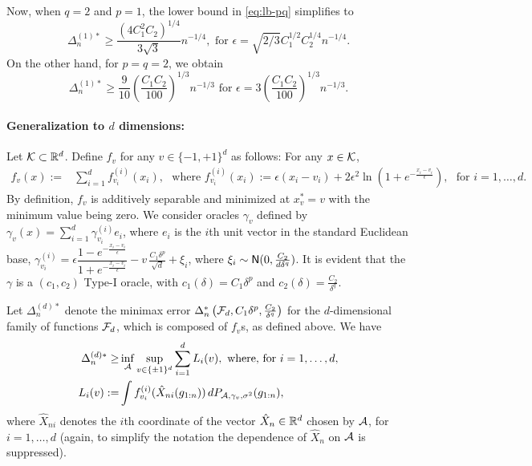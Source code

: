 Now, when $q=2$ and $p=1$, the lower bound in \eqref{eq:lb-pq} simplifies to
\[
\Delta_n^{(1)*} \ge \dfrac{ (4C_1^2C_2)^{1/4}}{3\sqrt{3}} n^{-1/4}, \text{ for } \epsilon=\sqrt{2/3}C_1^{1/2}C_2^{1/4} n^{-1/4}.
\]
On the other hand, for $p=q=2$, we obtain
\[
\Delta_n^{(1)*} \ge  \frac{9}{10}\left(\frac{C_1 C_2}{100}\right)^{1/3} n^{-1/3} \text{ for } \epsilon=3\left(\frac{C_1 C_2}{100}\right)^{1/3}n^{-1/3}.
\]



\paragraph{Generalization to $d$ dimensions:}

Let $\mathcal{K} \subset \mathbb{R}^d$.
Define $f_v$ for any $v\in \{-1,+1\}^d$ as follows: For any $x \in \mathcal{K}$, 
\begin{align*}
  f_v(x) :=& \sum_{i=1}^d f^{(i)}_{v_i}(x_i), \,\,  \text{ where }
  f^{(i)}_{v_i}(x_i) := \epsilon\left( x_i-v_i\right)+2\epsilon^2 \ln\left(1+e^{-\frac{x_i-v_i}{\epsilon}}  \right),  \,\, \text{ for } i=1,\ldots,d.
\end{align*}
By definition, $f_v$ is additively separable and minimized at $x^*_v=v$ with the minimum value being zero.
We consider oracles $\gamma_v$ defined by
$\gamma_v(x) = \sum_{i=1}^d \gamma_{v_i}^{(i)}e_i$, where 
$e_i$ is the $i$th unit vector in the standard Euclidean base,
$\gamma_{v_i}^{(i)} = 
\epsilon \dfrac{1-e^{-\frac{x_i-v_i}{\epsilon}}}{1+e^{-\frac{x_i-v_i}{\epsilon}}} - v\, \frac{C_1 \delta^p}{\sqrt{d}}  + \xi_i
$, where $\xi_i \sim \mathsf{N}(0,\frac{C_2}{d\delta^q})$. 
It is evident that the $\gamma$ is a $(c_1,c_2)$ Type-I oracle, with $c_1(\delta)=C_1\delta^p$ and $c_2(\delta)=\frac{C_2}{\delta^q}$.

Let $\Delta_n^{(d)*}$ denote the minimax error $\Delta_n^*\left(\mathcal{F}_d, C_1\delta^p,\frac{C_2}{\delta^q}\right)$ for the $d$-dimensional family of functions $\mathcal{F}_d$, which is composed of $f_v$s, as defined above. We have
\begin{align*}
 \Delta_n^{(d)*} \ge& \inf_{\mathcal{A}}  \sup_{v\in \{\pm 1 \}^d}\sum_{i=1}^d L_i(v), \text{ where, for } i=1,\ldots,d,\\
 L_i(v) := & \int f^{(i)}_{v_i}(\hat X_{ni}(g_{1:n}) )\, dP_{\mathcal{A},\gamma_v,\sigma^2}(g_{1:n}),  
\end{align*}
where $\hat{X}_{ni}$ denotes the $i$th coordinate of the vector $\hat{X}_n \in \mathbb{R}^d$ chosen by $\mathcal{A}$, for $i=1,\ldots,d$
(again, to simplify the notation the dependence of $\hat{X}_n$ on $\mathcal{A}$ is suppressed).


